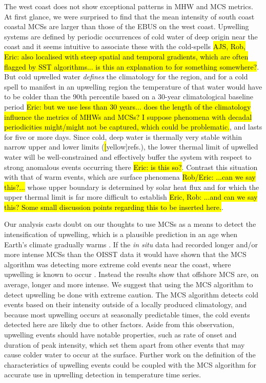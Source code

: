 \documentclass[a4paper,10pt,review]{elsarticle}
\begin{document}
The west coast does not show exceptional patterns in MHW and MCS metrics. At first glance, we were surprised to find that the mean intensity of south coast coastal MCSs are larger than those of the EBUS on the west coast. Upwelling systems are defined by periodic occurrences of cold water of deep origin near the coast and it seems intuitive to associate these with the cold-spells \hl{AJS, Rob, Eric: also localised with steep spatial and temporal gradients, which are often flagged by SST algorithms... is this an explanation to for something somewhere?}. But cold upwelled water \emph{defines} the climatology for the region, and for a cold spell to manifest in an upwelling region the temperature of that water would have to be colder than the 90th percentile based on a 30-year climatological baseline period \hl{Eric: but we use less than 30 years... does the length of the climatology influence the metrics of MHWs and MCSs? I suppose phenomena with decadal periodicities might/might not be captured, which could be problematic.}, and lasts for five or more days. Since cold, deep water is thermally very stable within narrow upper and lower limits (\hl[yellow]{refs.}), the lower thermal limit of upwelled water will be well-constrained and effectively buffer the system with respect to strong anomalous events occurring there \hl{Eric: is this so?}. Contrast this situation with that of warm events, which are surface phenomena \hl{Rob/Eric: ...can we say this?...} whose upper boundary is determined by solar heat flux and for which the upper thermal limit is far more difficult to establish \hl{Eric, Rob: ...and can we say this? Some small discussion points regarding this to be inserted here.}.

Our analysis casts doubt on our thoughts to use MCSs as a means to detect the intensification of upwelling, which is a plausible prediction in an age when Earth's climate gradually warms \citep{Garcia-Reyes2015}. If the \emph{in situ} data had recorded longer and/or more intense MCSs than the OISST data it would have shown that the MCS algorithm was detecting more extreme cold events near the coast, where upwelling is known to occur \citep{Lutjeharms2000, Hutchings2009}. Instead the results show that offshore MCS are, on average, longer and more intense. We suggest that using the MCS algorithm to detect upwelling be done with extreme caution. The MCS algorithm detects cold events based on their intensity outside of a locally produced climatology, and because most upwelling occurs at seasonally predictable times, the cold events detected here are likely due to other factors. Aside from this observation, upwelling events should have notable properties, such as rate of onset and duration of peak intensity, which set them apart from other events that may cause colder water to occur at the surface. Further work on the definition of the characteristics of upwelling events could be coupled with the MCS algorithm for accurate use in upwelling detection in temperature time series.
\end{document}
